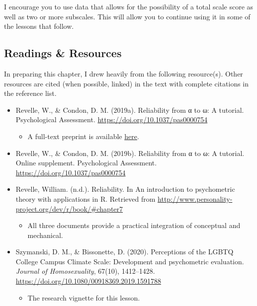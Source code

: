 \documentclass[
  english,
]{book}
\providecommand{\tightlist}{%
  \setlength{\itemsep}{0pt}\setlength{\parskip}{0pt}}
\begin{document}
I encourage you to use data that allows for the possibility of a total scale score as well as two or more subscales. This will allow you to continue using it in some of the lessons that follow.

\hypertarget{readings-resources-2}{%
\subsection{Readings \& Resources}\label{readings-resources-2}}

In preparing this chapter, I drew heavily from the following resource(s). Other resources are cited (when possible, linked) in the text with complete citations in the reference list.

\begin{itemize}
\tightlist
\item
  Revelle, W., \& Condon, D. M. (2019a). Reliability from α to ω: A tutorial. Psychological Assessment. \url{https://doi.org/10.1037/pas0000754}

  \begin{itemize}
  \tightlist
  \item
    A full-text preprint is available \href{https://personality-project.org/revelle/publications/rc.pa.19.pdf}{here}.
  \end{itemize}
\item
  Revelle, W., \& Condon, D. M. (2019b). Reliability from α to ω: A tutorial. Online supplement. Psychological Assessment. \url{https://doi.org/10.1037/pas0000754}
\item
  Revelle, William. (n.d.). Reliability. In An introduction to psychometric theory with applications in R. Retrieved from \url{http://www.personality-project.org/dev/r/book/\#chapter7}

  \begin{itemize}
  \tightlist
  \item
    All three documents provide a practical integration of conceptual and mechanical.
  \end{itemize}
\item
  Szymanski, D. M., \& Bissonette, D. (2020). Perceptions of the LGBTQ College Campus Climate Scale: Development and psychometric evaluation. \emph{Journal of Homosexuality}, 67(10), 1412--1428. \url{https://doi.org/10.1080/00918369.2019.1591788}

  \begin{itemize}
  \tightlist
  \item
    The research vignette for this lesson.
  \end{itemize}
\end{itemize}
\end{document}
